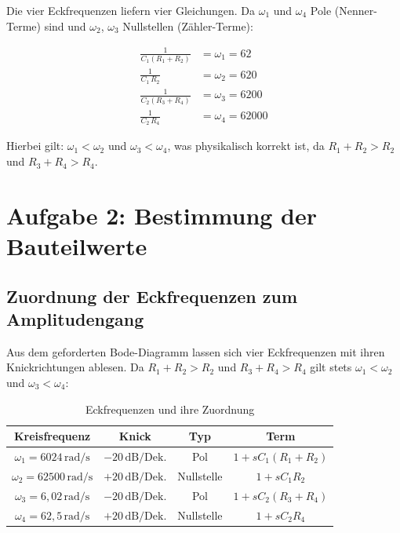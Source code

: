\documentclass[12pt,a4paper]{article}
\begin{document}
Die vier Eckfrequenzen liefern vier Gleichungen. Da $\omega_1$ und $\omega_4$ Pole
(Nenner-Terme) sind und $\omega_2$, $\omega_3$ Nullstellen (Zähler-Terme):

\begin{align}
  \frac{1}{C_1(R_1 + R_2)} &= \omega_1 = 62    \label{eq:omega1} \\[6pt]
  \frac{1}{C_1 \, R_2}      &= \omega_2 = 620   \label{eq:omega2} \\[6pt]
  \frac{1}{C_2(R_3 + R_4)}  &= \omega_3 = 6200  \label{eq:omega3} \\[6pt]
  \frac{1}{C_2 \, R_4}      &= \omega_4 = 62000 \label{eq:omega4}
\end{align}

Hierbei gilt: $\omega_1 < \omega_2$ und $\omega_3 < \omega_4$, was physikalisch
korrekt ist, da $R_1 + R_2 > R_2$ und $R_3 + R_4 > R_4$.

\section{Aufgabe 2: Bestimmung der Bauteilwerte}

\subsection{Zuordnung der Eckfrequenzen zum Amplitudengang}

Aus dem geforderten Bode-Diagramm lassen sich vier Eckfrequenzen mit ihren
Knickrichtungen ablesen. Da $R_1+R_2 > R_2$ und $R_3+R_4 > R_4$ gilt stets
$\omega_1 < \omega_2$ und $\omega_3 < \omega_4$:

\begin{table}[H]
  \centering
  \caption{Eckfrequenzen und ihre Zuordnung}
  \begin{tabular}{cccc}
    \toprule
    Kreisfrequenz & Knick & Typ & Term \\
    \midrule
    $\omega_1 = 6024\,\text{rad/s}$   & $-20\,\text{dB/Dek.}$ & Pol        & $1 + sC_1(R_1+R_2)$ \\
    $\omega_2 = 62500\,\text{rad/s}$  & $+20\,\text{dB/Dek.}$ & Nullstelle & $1 + sC_1 R_2$ \\
    $\omega_3 = 6{,}02\,\text{rad/s}$ & $-20\,\text{dB/Dek.}$ & Pol        & $1 + sC_2(R_3+R_4)$ \\
    $\omega_4 = 62{,}5\,\text{rad/s}$ & $+20\,\text{dB/Dek.}$ & Nullstelle & $1 + sC_2 R_4$ \\
    \bottomrule
  \end{tabular}
\end{table}
\end{document}
